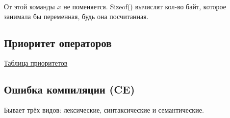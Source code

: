 От этой команды $x$ не поменяется. Sizeof() вычислят кол-во байт, которое занимала бы переменная, будь она посчитанная.


\subsection{Приоритет операторов}

\href{https://en.cppreference.com/w/cpp/language/operator_precedence}{Таблица приоритетов}


\subsection{Ошибка компиляции (CE)}

Бывает трёх видов: лексические, синтаксические и семантические.











